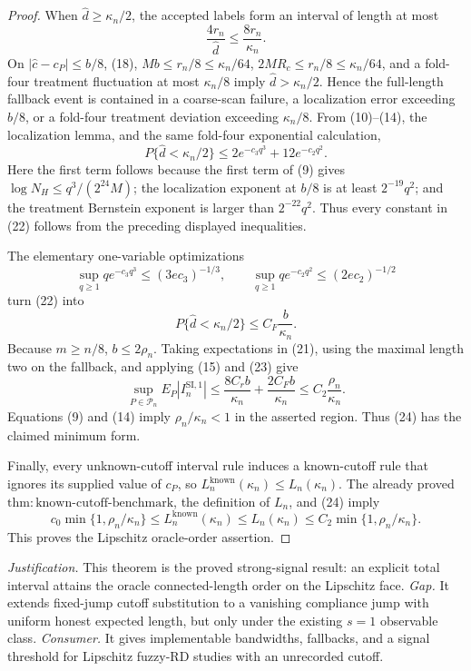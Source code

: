 \documentclass{article}
\begin{document}
\begin{proof}
When \(\widehat d\ge\kappa_n/2\), the accepted labels form an interval
of length at most
\[
 \frac{4r_n}{\widehat d}\le\frac{8r_n}{\kappa_n}. \tag{21}
\]
On \(|\widehat c-c_P|\le b/8\), (18),
\(Mb\le r_n/8\le\kappa_n/64\),
\(2MR_c\le r_n/8\le\kappa_n/64\), and a fold-four treatment
fluctuation at most \(\kappa_n/8\) imply
\(\widehat d>\kappa_n/2\).  Hence the full-length fallback event is
contained in a coarse-scan failure, a localization error exceeding
\(b/8\), or a fold-four treatment deviation exceeding
\(\kappa_n/8\).  From (10)--(14), the localization lemma, and the same
fold-four exponential calculation,
\[
 P\{\widehat d<\kappa_n/2\}
 \le2e^{-c_3q^3}+12e^{-c_2q^2}. \tag{22}
\]
Here the first term follows because the first term of (9) gives
\(\log N_H\le q^3/(2^{24}M)\); the localization exponent at \(b/8\)
is at least \(2^{-19}q^2\); and the treatment Bernstein exponent is
larger than \(2^{-22}q^2\).  Thus every constant in (22) follows from
the preceding displayed inequalities.

The elementary one-variable optimizations
\[
 \sup_{q\ge1}qe^{-c_3q^3}\le(3ec_3)^{-1/3},
 \qquad
 \sup_{q\ge1}qe^{-c_2q^2}\le(2ec_2)^{-1/2}
\]
turn (22) into
\[
 P\{\widehat d<\kappa_n/2\}
 \le C_F\frac{b}{\kappa_n}. \tag{23}
\]
Because \(m\ge n/8\), \(b\le2\rho_n\).  Taking expectations in
(21), using the maximal length two on the fallback, and applying
(15) and (23) give
\[
 \sup_{P\in\mathcal P_n}E_P|I_n^{\mathrm{SI},1}|
 \le\frac{8C_rb}{\kappa_n}+\frac{2C_Fb}{\kappa_n}
 \le C_2\frac{\rho_n}{\kappa_n}. \tag{24}
\]
Equations (9) and (14) imply \(\rho_n/\kappa_n<1\) in the asserted
region.  Thus (24) has the claimed minimum form.

Finally, every unknown-cutoff interval rule induces a known-cutoff rule
that ignores its supplied value of \(c_P\), so
\(L_n^{\mathrm{known}}(\kappa_n)\le L_n(\kappa_n)\).  The already
proved \(\mathrm{thm:known\mbox{-}cutoff\mbox{-}benchmark}\), the
definition of \(L_n\), and (24) imply
\[
 c_0\min\{1,\rho_n/\kappa_n\}
 \le L_n^{\mathrm{known}}(\kappa_n)
 \le L_n(\kappa_n)
 \le C_2\min\{1,\rho_n/\kappa_n\}.
\]
This proves the Lipschitz oracle-order assertion.
\end{proof}
\par\smallskip\noindent \textit{Justification.} This theorem is the proved strong-signal result: an explicit total interval attains the oracle connected-length order on the Lipschitz face. \textit{Gap.} It extends fixed-jump cutoff substitution to a vanishing compliance jump with uniform honest expected length, but only under the existing \(s=1\) observable class. \textit{Consumer.} It gives implementable bandwidths, fallbacks, and a signal threshold for Lipschitz fuzzy-RD studies with an unrecorded cutoff.
\end{document}
